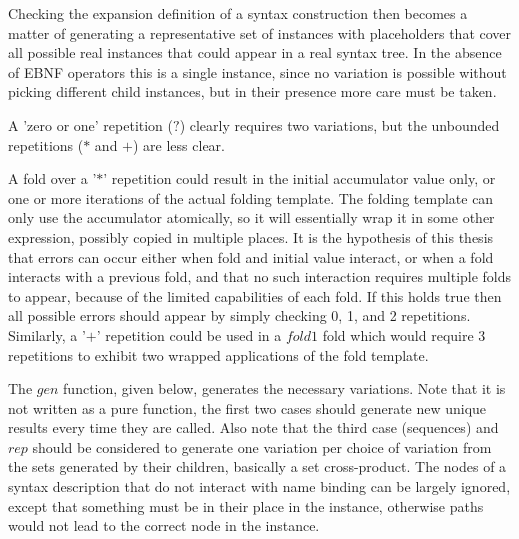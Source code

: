 \documentclass{kththesis}
\begin{document}
Checking the expansion definition of a syntax construction then becomes a matter of generating a representative set of instances with placeholders that cover all possible real instances that could appear in a real syntax tree. In the absence of EBNF operators this is a single instance, since no variation is possible without picking different child instances, but in their presence more care must be taken.

A 'zero or one' repetition ($?$) clearly requires two variations, but the unbounded repetitions ($*$ and $+$) are less clear.

A fold over a '$*$' repetition could result in the initial accumulator value only, or one or more iterations of the actual folding template. The folding template can only use the accumulator atomically, so it will essentially wrap it in some other expression, possibly copied in multiple places. It is the hypothesis of this thesis that errors can occur either when fold and initial value interact, or when a fold interacts with a previous fold, and that no such interaction requires multiple folds to appear, because of the limited capabilities of each fold. If this holds true then all possible errors should appear by simply checking 0, 1, and 2 repetitions. Similarly, a '$+$' repetition could be used in a $fold1$ fold which would require 3 repetitions to exhibit two wrapped applications of the fold template.

The $gen$ function, given below, generates the necessary variations. Note that it is not written as a pure function, the first two cases should generate new unique results every time they are called. Also note that the third case (sequences) and $rep$ should be considered to generate one variation per choice of variation from the sets generated by their children, basically a set cross-product. The nodes of a syntax description that do not interact with name binding can be largely ignored, except that something must be in their place in the instance, otherwise paths would not lead to the correct node in the instance.

\end{document}
